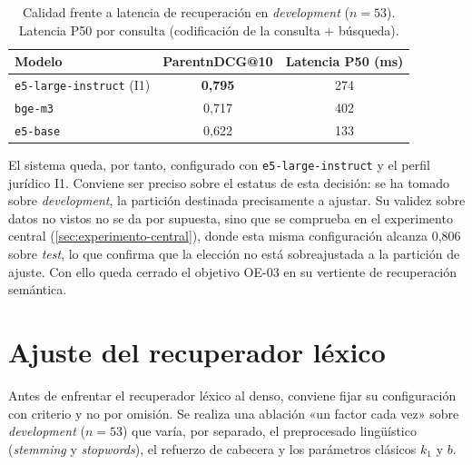 \begin{table}[htbp]
    \centering
    \small
    \renewcommand{\arraystretch}{1.2}
    \caption{Calidad frente a latencia de recuperación en \emph{development} ($n=53$). Latencia P50 por consulta (codificación de la consulta + búsqueda).}
    \label{tab:latencia-embeddings}
    \begin{tabular}{|l|c|c|}
        \hline
        \textbf{Modelo} & \textbf{ParentnDCG@10} & \textbf{Latencia P50 (ms)} \\
        \hline
        \texttt{e5-large-instruct} (I1) & \textbf{0,795} & 274 \\
        \texttt{bge-m3}                 & 0,717          & 402 \\
        \texttt{e5-base}                & 0,622          & 133 \\
        \hline
    \end{tabular}
\end{table}

El sistema queda, por tanto, configurado con \texttt{e5-large-instruct} y el perfil jurídico I1. Conviene ser preciso sobre el estatus de esta decisión: se ha tomado sobre \emph{development}, la partición destinada precisamente a ajustar. Su validez sobre datos no vistos no se da por supuesta, sino que se comprueba en el experimento central (\ref{sec:experimento-central}), donde esta misma configuración alcanza 0,806 sobre \emph{test}, lo que confirma que la elección no está sobreajustada a la partición de ajuste. Con ello queda cerrado el objetivo OE-03 en su vertiente de recuperación semántica.

\section{Ajuste del recuperador léxico}
\label{sec:ablacion-bm25}

Antes de enfrentar el recuperador léxico al denso, conviene fijar su configuración con criterio y no por omisión. Se realiza una ablación «un factor cada vez» sobre \emph{development} ($n=53$) que varía, por separado, el preprocesado lingüístico (\emph{stemming} y \emph{stopwords}), el refuerzo de cabecera y los parámetros clásicos $k_1$ y $b$.

